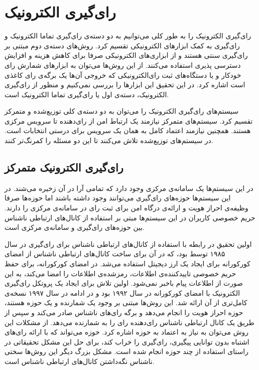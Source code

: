 \section{رای‌گیری الکترونیک}
رای‌گیری الکترونیک را به طور کلی می‌توانیم به دو دسته‌ی رای‌گیری تماما الکترونیک و رای‌گیری به کمک ابزار‌های الکترونیکی تقسیم کرد. روش‌های دسته‌ی دوم مبتنی بر رای‌گیری سنتی هستند و از ابزاری‌های الکترونیکی صرفا برای کاهش هزینه و افزایش دسترسی پذیری استفاده می‌کنند. از این روش‌ها می‌توان به ابزارهای شمارش رای خودکار و یا دستگاه‌های ثبت رای‌الکترونیکی که خروجی آن‌ها یک برگه‌ی رای‌ کاغذی
است اشاره کرد. در این تحقیق این ابزارها را بررسی نمی‌کنیم و منظور از رای‌گیری الکترونیک، دسته‌ی اول یا رای‌گیری تماما الکترونیک است.
\par
سیستم‌های رای‌گیری الکترونیک را می‌توان به دو دسته‌ی کلی توزیع‌شده و متمرکز تقسیم کرد. سیستم‌های متمرکز نیازمند یک ارتباط امن از رای‌دهنده تا سرویس مرکزی هستند. همچنین نیازمند اعتماد کامل به همان یک سرویس برای درستی انتخابات است. در سیستم‌های توزیع‌شده تلاش می‌کنند تا این دو مسئله را کمرنگ‌تر کنند.

\subsection{رای‌گیری الکترونیک متمرکز}
در این سیستم‌ها یک سامانه‌ی مرکزی وجود دارد که تمامی آرا در آن زخیره می‌شند. در این سیستم‌ها حوزه‌های رای‌گیری می‌توانند وجود داشته باشند اما حوزه‌ها صرفا وظیفه‌ی احراز هویت و ارائه‌ی درگاه امن برای ثبت رای در سامانه‌ی مرکزی را دارند. حریم خصوصی کاربران در این سیستم‌ها مبتی بر استفاده از کانال‌های ارتباطی ناشناس 
بین حوزه‌های رای‌گیری و سامانه‌ی مرکزی است.
\par
اولین تحقیق در رابطه با استفاده‌ از کانال‌های ارتباطی ناشناس برای رای‌گیری در سال ۱۹۸۵ توسط 
\cite{Chaum}
بود، که در آن برای ساخت‌ کانال‌های ارتباطی ناشناس از امضای کورکورانه 
\cite{blindsig}
برای ایجاد یک ارز دیجیتل استفاده می‌شد. در امضای کورکورانه، برای حفظ حریم خصوصی تاییدکننده‌ی اطلاعات، رمزشده‌ی اطلاعات را امضا می‌کند، به این صورت از اطلاعات پیام باخبر نمی‌شود. اولین تلاش برای ایجاد یک پروتکل رای‌گیری الکترونیک با امضای کورکورانه در سال ۱۹۹۲ 
\cite{foo92}
بود و در ادامه در سال ۱۹۹۷
\cite{improveblind}
نسخه‌ی کامل‌تری از آن ارائه شد. این روش‌ها مبتنی بر وجود یک شمارنده و یک حوزه هستند، حوزه احراز هویت را انجام می‌دهد و برگه‌ رای‌های ناشناس صادر می‌کند و سپس از طریق یک کانال ارتباطی ناشناس رای‌دهنده رای را به شمارنده می‌دهد. از مشکلات این روش می‌توان به نیاز به اعتماد به حوزه اشاره کرد. حوزه می‌تواند که با ارائه رای‌های اشتباه بدون توانایی پیگیری، رای‌گیری را خراب کند، برای حل این مشکل تحقیقاتی
\cite{multiteller}
در راستای استفاده از چند حوزه انجام شده است. مشکل بزرگ دیگر این روش‌ها
\cite{anonchan}
سختی ناشناس نگه‌داشتن کانال‌های ارتباطی ناشناس است.

